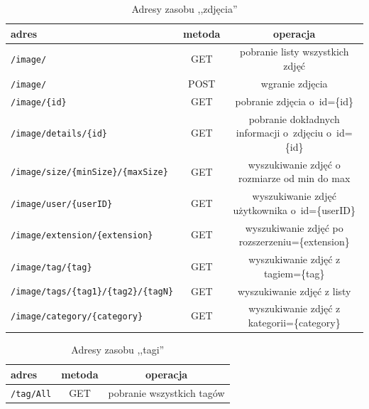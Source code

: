 \begin{table}[ht]
	\centering
	\caption{Adresy zasobu ,,zdjęcia''}
	\label{table:restImages}
 \begin{tabular}{|l|c|c|}
	\hline 
	adres & metoda & operacja  \\
	\hline 
	\texttt{/image/} & GET &  pobranie listy wszystkich zdjęć \\
	\hline 
    \texttt{/image/} & POST &  wgranie zdjęcia \\
    \hline 
	\texttt{/image/\{id\}} & GET & pobranie zdjęcia o~id=\{id\} \\	
	\hline 
	\texttt{/image/details/\{id\}} & GET & pobranie dokładnych informacji o~zdjęciu o~id=\{id\} \\	
	\hline 
	\texttt{/image/size/\{minSize\}/\{maxSize\}} & GET & wyszukiwanie zdjęć o rozmiarze od min do max \\
	\hline 
	\texttt{/image/user/\{userID\}} & GET & wyszukiwanie zdjęć użytkownika o~id=\{userID\} \\
    \hline 
    \texttt{/image/extension/\{extension\}} & GET & wyszukiwanie zdjęć po rozszerzeniu=\{extension\} \\
    \hline 
    \texttt{/image/tag/\{tag\}} & GET & wyszukiwanie zdjęć z tagiem=\{tag\}\\
    \hline 
    \texttt{/image/tags/\{tag1\}/\{tag2\}/\{tagN\}} & GET & wyszukiwanie zdjęć z listy\\
    \hline 
    \texttt{/image/category/\{category\}} & GET & wyszukiwanie zdjęć z kategorii=\{category\}\\
    \hline 
\end{tabular}
\end{table}

\begin{table}[!ht]
\centering
\caption{Adresy zasobu ,,tagi''}
\label{table:restTags}
\begin{tabular}{|l|c|c|}
	\hline 
	adres & metoda & operacja  \\
	\hline
	\texttt{/tag/All} & GET & pobranie wszystkich tagów \\
	\hline
\end{tabular}
\end{table}

